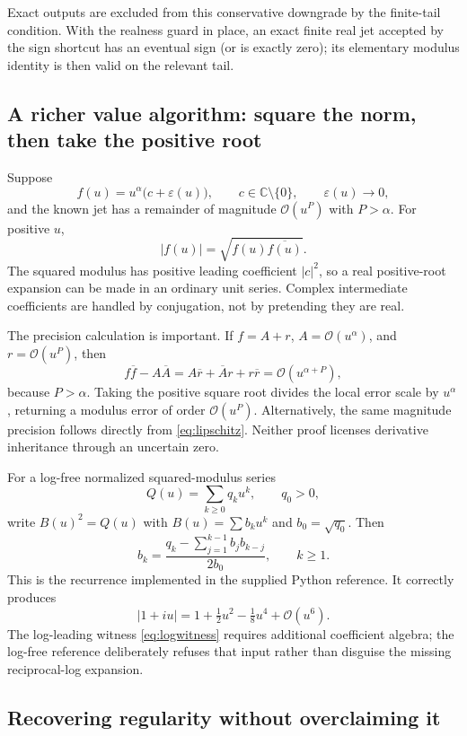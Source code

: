 \documentclass[11pt,a4paper]{article}
\newcommand{\OO}{\mathcal O}
\newcommand{\CC}{\mathbb C}
\begin{document}
Exact outputs are excluded from this conservative downgrade by the finite-tail condition. With the realness guard in place, an exact finite real jet accepted by the sign shortcut has an eventual sign (or is exactly zero); its elementary modulus identity is then valid on the relevant tail.

\subsection{A richer value algorithm: square the norm, then take the positive root}

Suppose
\[
 f(u)=u^\alpha\bigl(c+\varepsilon(u)\bigr),\qquad c\in\CC\setminus\{0\},
 \qquad \varepsilon(u)\to0,
\]
and the known jet has a remainder of magnitude $\OO(u^P)$ with $P>\alpha$. For positive $u$,
\begin{equation}\label{eq:normsquare}
 |f(u)|=\sqrt{f(u)\overline{f(u)}}.
\end{equation}
The squared modulus has positive leading coefficient $|c|^2$, so a real positive-root expansion can be made in an ordinary unit series. Complex intermediate coefficients are handled by conjugation, not by pretending they are real.

The precision calculation is important. If $f=A+r$, $A=\OO(u^\alpha)$, and $r=\OO(u^P)$, then
\[
 f\overline f-A\overline A
 =A\overline r+\overline A r+r\overline r
 =\OO(u^{\alpha+P}),
\]
because $P>\alpha$. Taking the positive square root divides the local error scale by $u^\alpha$, returning a modulus error of order $\OO(u^P)$. Alternatively, the same magnitude precision follows directly from \eqref{eq:lipschitz}. Neither proof licenses derivative inheritance through an uncertain zero.

For a log-free normalized squared-modulus series
\[
 Q(u)=\sum_{k\geq0}q_k u^k,\qquad q_0>0,
\]
write $B(u)^2=Q(u)$ with $B(u)=\sum b_k u^k$ and $b_0=\sqrt{q_0}$. Then
\begin{equation}\label{eq:rootrecurrence}
 b_k=\frac{q_k-\sum_{j=1}^{k-1}b_jb_{k-j}}{2b_0},\qquad k\geq1.
\end{equation}
This is the recurrence implemented in the supplied Python reference. It correctly produces
\[
 |1+i u|=1+\tfrac12u^2-\tfrac18u^4+\OO(u^6).
\]
The log-leading witness \eqref{eq:logwitness} requires additional coefficient algebra; the log-free reference deliberately refuses that input rather than disguise the missing reciprocal-log expansion.

\subsection{Recovering regularity without overclaiming it}
\end{document}
